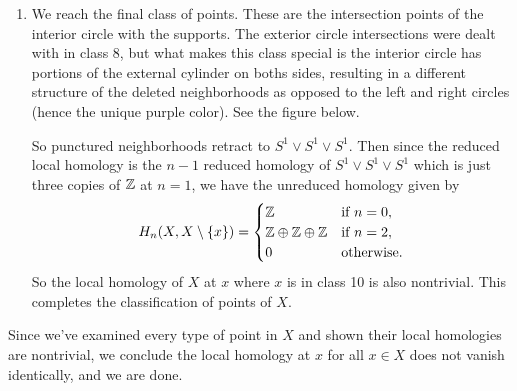 \begin{solution}
\begin{enumerate}
    \begin{figure}[H]
    \centering
    \label{h9}
    \end{figure}
\item We reach the final class of points. These are the intersection points of the interior circle with the supports. The exterior circle intersections were dealt with in class 8, but what makes this class special is the interior circle has portions of the external cylinder on boths sides, resulting in a different structure of the deleted neighborhoods as opposed to the left and right circles (hence the unique purple color). See the figure below.
    \begin{figure}[H]
    \centering
    \label{h10}
    \end{figure}
    So punctured neighborhoods retract to $S^1 \vee S^1 \vee S^1 $. Then since the reduced local homology is the $n-1$ reduced homology of $S^1 \vee S^1 \vee S^1 $ which is just three copies of $\mathbb{Z}$ at $n=1$, we have the unreduced homology given by \[
        H_n (X,X \setminus \{x\} )= 
        \begin{cases}
            \mathbb{Z} \quad & \text{if} \ n=0,\\
            \mathbb{Z}\oplus \mathbb{Z}\oplus \mathbb{Z} &\text{if} \ n=2,\\
            0 & \text{otherwise.} 
        \end{cases}
    \] So the local homology of $X$ at $x$ where $x$ is in class 10 is also nontrivial. This completes the classification of points of $X$.
    \end{enumerate}
Since we've examined every type of point in $X$ and shown their local homologies are nontrivial, we conclude the local homology at $x$ for all $x\in X$ does not vanish identically, and we are done.

\end{solution}

